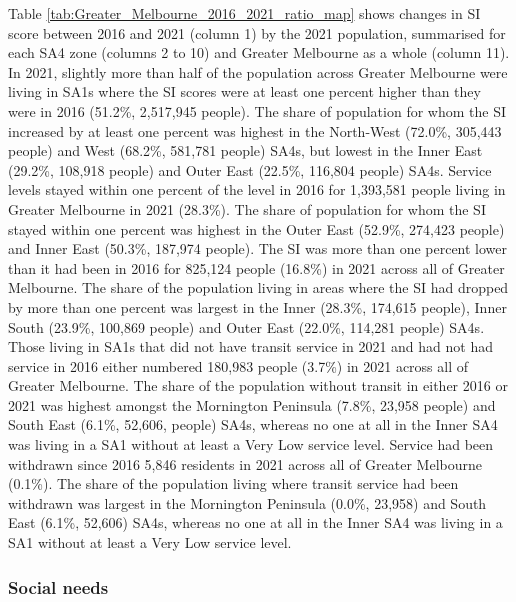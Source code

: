 \documentclass[preprint, 3p,
authoryear]{elsarticle} %
\begin{document}
Table \ref{tab:Greater_Melbourne_2016_2021_ratio_map} shows changes in
SI score between 2016 and 2021 (column 1) by the 2021 population,
summarised for each SA4 zone (columns 2 to 10) and Greater Melbourne as
a whole (column 11). In 2021, slightly more than half of the population
across Greater Melbourne were living in SA1s where the SI scores were at
least one percent higher than they were in 2016 (51.2\%, 2,517,945
people). The share of population for whom the SI increased by at least
one percent was highest in the North-West (72.0\%, 305,443 people) and
West (68.2\%, 581,781 people) SA4s, but lowest in the Inner East
(29.2\%, 108,918 people) and Outer East (22.5\%, 116,804 people) SA4s.
Service levels stayed within one percent of the level in 2016 for
1,393,581 people living in Greater Melbourne in 2021 (28.3\%). The share
of population for whom the SI stayed within one percent was highest in
the Outer East (52.9\%, 274,423 people) and Inner East (50.3\%, 187,974
people). The SI was more than one percent lower than it had been in 2016
for 825,124 people (16.8\%) in 2021 across all of Greater Melbourne. The
share of the population living in areas where the SI had dropped by more
than one percent was largest in the Inner (28.3\%, 174,615 people),
Inner South (23.9\%, 100,869 people) and Outer East (22.0\%, 114,281
people) SA4s. Those living in SA1s that did not have transit service in
2021 and had not had service in 2016 either numbered 180,983 people
(3.7\%) in 2021 across all of Greater Melbourne. The share of the
population without transit in either 2016 or 2021 was highest amongst
the Mornington Peninsula (7.8\%, 23,958 people) and South East (6.1\%,
52,606, people) SA4s, whereas no one at all in the Inner SA4 was living
in a SA1 without at least a Very Low service level. Service had been
withdrawn since 2016 5,846 residents in 2021 across all of Greater
Melbourne (0.1\%). The share of the population living where transit
service had been withdrawn was largest in the Mornington Peninsula
(0.0\%, 23,958) and South East (6.1\%, 52,606) SA4s, whereas no one at
all in the Inner SA4 was living in a SA1 without at least a Very Low
service level.

\subsubsection{Social needs}\label{social-needs}
\end{document}
